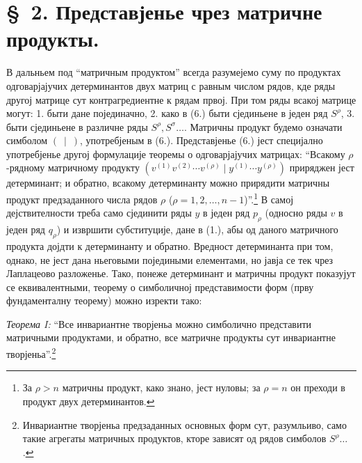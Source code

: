 ﻿\documentclass[11pt]{article}
\begin{document}
\section*{\S\ 2. Представјенье чрез матричне продукты.}

В дальньем под ``матричным продуктом'' всегда разумејемо суму по продуктах одговарјајучих детерминантов двух матриц с равным числом рядов, кде ряды другој матрице сут контрагредиентне к рядам првој. При том ряды всакој матрице могут: 1. быти дане појединачно, 2. како в (6.) быти сјединьене в једен ряд $S^\rho$, 3. быти сјединьене в различне ряды $S^\rho,S^\sigma\ldots$. Матричны продукт будемо означати симболом $(\ \mid\ )$, употребјеным в (6.). Представјенье (6.) јест специјално употребјенье другој формулације теоремы о одговарјајучих матрицах: ``Всакому $\rho$-рядному матричному продукту $(v^{(1)}v^{(2)}\cdots v^{(\rho)}\mid y^{(1)}\cdots y^{(\rho)})$ приряджен јест детерминант; и обратно, всакому детерминанту можно прирядити матричны продукт предзаданного числа рядов $\rho$ ($\rho=1,2,\ldots,n-1$)''.\footnote{За $\rho>n$ матричны продукт, како знано, јест нуловы; за $\rho=n$ он преходи в продукт двух детерминантов.} В самој дејствителности треба само сјединити ряды $y$ в једен ряд $p_\rho$ (односно ряды $v$ в једен ряд $q_\rho$) и извршити субституције, дане в (1.), абы од даного матричного продукта дојдти к детерминанту и обратно. Вредност детерминанта при том, однако, не јест дана ньеговыми поједиными елементами, но јавја се тек чрез Лаплацеово разложенье. Тако, понеже детерминант и матричны продукт показујут се еквивалентными, теорему о симболичној представимости форм (прву фундаменталну теорему) можно изректи тако:

\emph{Теорема I:} ``Все инвариантне творјеньа можно симболично представити матричными продуктами, и обратно, все матричне продукты сут инвариантне творјеньа''.\footnote{Инвариантне творјеньа предзаданных основных форм сут, разумльиво, само такие агрегаты матричных продуктов, кторе зависят од рядов симболов $S^\rho\ldots$.}
\end{document}
